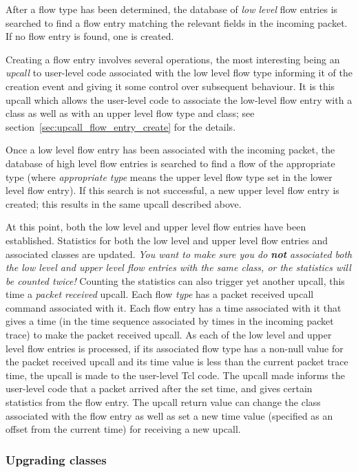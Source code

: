 \documentclass{article}
\begin{document}
After a flow type has been determined, the database of \emph{low level}
flow entries is searched to find a flow entry matching the relevant
fields in the incoming packet.  If no flow entry is found, one is
created.

Creating a flow entry involves several operations, the most interesting
being an \emph{upcall} to user-level code associated with the low level
flow type informing it of the creation event and giving it some control
over subsequent behaviour.  It is this upcall which allows the
user-level code to associate the low-level flow entry with a class as
well as with an upper level flow type and class; see
section~\ref{sec:upcall_flow_entry_create} for the details.

Once a low level flow entry has been associated with the incoming
packet, the database of high level flow entries is searched to find a
flow of the appropriate type (where \emph{appropriate type} means the
upper level flow type set in the lower level flow entry).  If this
search is not successful, a new upper level flow entry is created; this
results in the same upcall described above.

At this point, both the low level and upper level flow entries have
been established.  Statistics for both the low level and upper level
flow entries and associated classes are updated.  \emph{You want to
make sure you do \textbf{not} associated both the low level and upper
level flow entries with the same class, or the statistics will be
counted twice!}  Counting the statistics can also trigger yet another
upcall, this time a \emph{packet received} upcall.  Each flow
\emph{type} has a packet received upcall command associated with it.
Each flow entry has a time associated with it that gives a time (in the
time sequence associated by times in the incoming packet trace) to make
the packet received upcall.  As each of the low level and upper level
flow entries is processed, if its associated flow type has a non-null
value for the packet received upcall and its time value is less than
the current packet trace time, the upcall is made to the user-level Tcl
code.  The upcall made informs the user-level code that a packet
arrived after the set time, and gives certain statistics from the flow
entry.  The upcall return value can change the class associated with
the flow entry as well as set a new time value (specified as an offset
from the current time) for receiving a new upcall.

\subsubsection{Upgrading classes}
\end{document}
